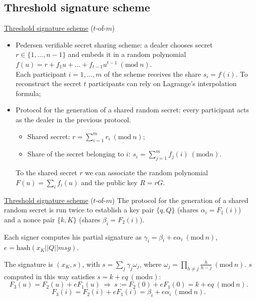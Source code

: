 \documentclass[slidescentered]{beamer}
\begin{document}
	\subsection{Threshold signature scheme}
	\begin{frame}{\hyperlink{threshold}{Threshold signature scheme} ($t$-of-$m$)}
		\begin{itemize}
			\item Pedersen verifiable secret sharing scheme: a dealer chooses secret $r \in \{1, ..., n - 1\}$ and embeds it in a random polynomial $f(u) = r + f_1u + ... + f_{t - 1}u^{t - 1} \ (\text{mod} \ n)$. 
			\\
			Each participant $i = 1, ..., m$ of the scheme receives the share $s_i = f(i)$. To reconstruct the secret $t$ participants can rely on Lagrange's interpolation formula;
			\item Protocol for the generation of a shared random secret: every participant acts as the dealer in the previous protocol. 
			\begin{itemize}
				\item Shared secret: $r = \sum_{i = 1}^{m}r_i \ (\text{mod} \ n)$;
				\item Share of the secret belonging to $i$: $s_i = \sum_{j = 1}^{m}f_j(i) \ (\text{mod} n)$.
			\end{itemize}
		To the shared secret $r$ we can associate the random polynomial $F(u) = \sum_{i}f_i(u)$ and the public key $R = rG$.
		\end{itemize}
	\end{frame}

	\begin{frame}{\hyperlink{threshold}{Threshold signature scheme} ($t$-of-$m$)}
		The protocol for the generation of a shared random secret is run twice to establish a key pair $\{q, Q\}$ (shares $\alpha_i = F_1(i)$) and a nonce pair $\{k, K\}$ (shares $\beta_i = F_2(i)$).
		
		\bigskip
		\noindent
		Each signer computes his partial signature as $\gamma_i = \beta_i + e\alpha_i \ (\text{mod} \ n)$, $e = \text{hash}(x_K || Q || msg)$.
		
		\bigskip
		\noindent
		The signature is $(x_K, s)$, with $s = \sum_{j}\gamma_j\omega_j$, where $\omega_j = \prod_{h \neq j}\frac{h}{h - j} \ (\text{mod} \ n)$.
		$s$ computed in this way satisfies $s = k + eq \ (\text{mod} n)$: 
		$$F_3(u) = F_2(u) + eF_1(u) \ \Longrightarrow \ s := F_2(0) + eF_1(0) = k + eq \ (\text{mod} \ n).$$
		$$F_3(i) = F_2(i) + eF_1(i) = \beta_i + e\alpha_i \ (\text{mod} \ n).$$
	\end{frame}
\end{document}
